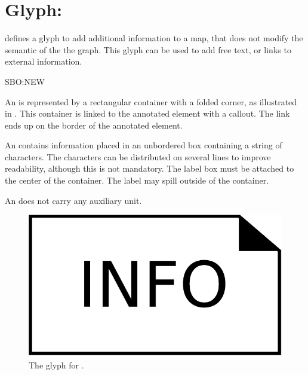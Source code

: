 
\section{Glyph: }
\label{sec:annotation}

\SBGNERLone defines a glyph to add additional information to a map, that does not modify the semantic of the the graph. This glyph can be used to add free text, or links to external information.

\begin{glyphDescription}

\glyphSboTerm SBO:NEW

\glyphContainer An  is represented by a rectangular container with a folded corner, as illustrated in . This container is linked to the annotated element with a callout. The link ends up on the border of the annotated element.

\glyphLabel An  contains information placed in an unbordered box containing a string of characters.  The characters can be distributed on several lines to improve readability, although this is not mandatory.  The label box must be attached to the center of the container. The label may spill outside of the container. 

\glyphAux An  does not carry any auxiliary unit.
\end{glyphDescription}

\begin{figure}[H]
  \centering
  \includegraphics[scale = 0.3]{images/annotation}
  \caption{The \ER glyph for .}
  \label{fig:annotation}
\end{figure}

